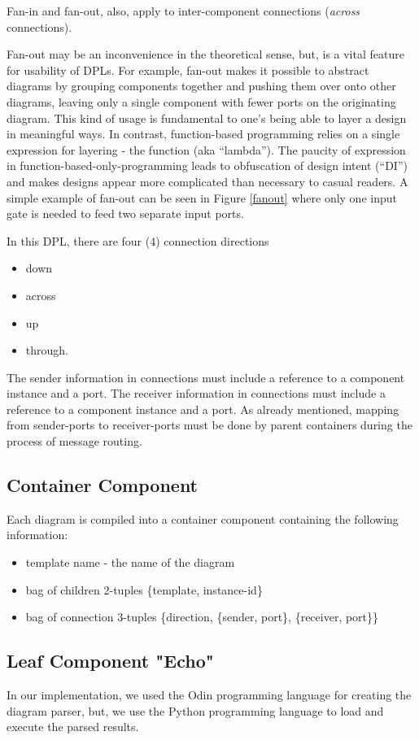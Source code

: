 \documentclass[10pt,anonymous,review]{acmart}
\begin{document}
Fan-in and fan-out, also, apply to inter-component connections (\emph{across} connections).

Fan-out may be an inconvenience in the theoretical sense, but, is a vital feature for usability of DPLs. For example, fan-out makes it possible to abstract diagrams by grouping components together and pushing them over onto other diagrams, leaving only a single component with fewer ports on the originating diagram. This kind of usage is fundamental to one’s being able to layer a design in meaningful ways. In contrast, function-based programming relies on a single expression for layering - the function (aka “lambda”). The paucity of expression in function-based-only-programming leads to obfuscation of design intent (“DI”) and makes designs appear more complicated than necessary to casual readers. A simple example of fan-out can be seen in Figure \ref{fanout} where only one input gate is needed to feed two separate input ports.




In this DPL, there are four (4) connection directions
\begin{itemize}
\item down
\item across
\item up
\item through.
\end{itemize}
The sender information in connections must include a reference to a component instance and a port.
The receiver information in connections must include a reference to a component instance and a port.
As already mentioned, mapping from sender-ports to receiver-ports must be done by parent containers during the process of message routing.
\subsection{Container Component}
Each diagram is compiled into a container component containing the following information:
\begin{itemize}
\item template name - the name of the diagram
\item bag of children 2-tuples \{template, instance-id\}
\item bag of connection 3-tuples \{direction, \{sender, port\}, \{receiver, port\}\}
\end{itemize}

\subsection{Leaf Component "Echo"}
In our implementation, we used the Odin programming language for
creating the diagram parser, but, we use the Python programming
language to load and execute the parsed results.
\end{document}
